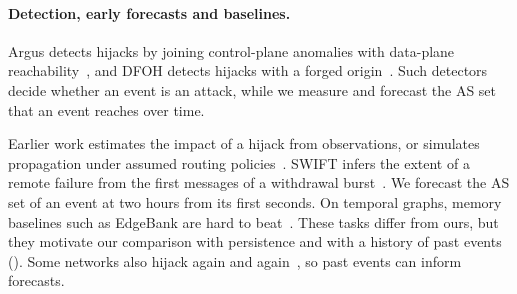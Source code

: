 \paragraph{Detection, early forecasts and baselines.}
Argus detects hijacks by joining control-plane anomalies with data-plane reachability~\cite{shi2012argus}, and DFOH detects hijacks with a forged origin~\cite{holterbach2024dfoh}.
Such detectors decide whether an event is an attack, while we measure and forecast the AS set that an event reaches over time.

Earlier work estimates the impact of a hijack from observations, or simulates propagation under assumed routing policies~\cite{sermpezis2021impact,furuness2023}.
SWIFT infers the extent of a remote failure from the first messages of a withdrawal burst~\cite{holterbach2017swift}.
We forecast the AS set of an event at two hours from its first seconds.
On temporal graphs, memory baselines such as EdgeBank are hard to beat~\cite{poursafaei2022,huang2023tgb}.
These tasks differ from ours, but they motivate our comparison with persistence and with a history of past events ().
Some networks also hijack again and again~\cite{testart2019serialhijackers}, so past events can inform forecasts.
